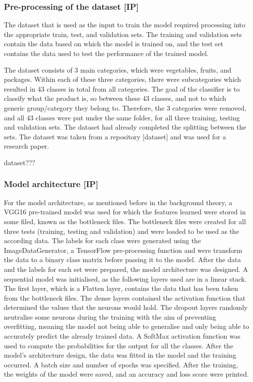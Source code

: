 \subsubsection{Pre-processing of the dataset [IP]}

The dataset that is used as the input to train the model required processing into the appropriate train, test, and validation sets.
The training and validation sets contain the data based on which the model is trained on, and the test set contains the data used to test the performance of the trained model.

The dataset consists of 3 main categories, which were vegetables, fruits, and packages.
Within each of these three categories, there were subcategories which resulted in 43 classes in total from all categories.
The goal of the classifier is to classify what the product is, so between these 43 classes, and not to which generic group/category they belong to.
Therefore, the 3 categories were removed, and all 43 classes were put under the same folder, for all three training, testing and validation sets.
The dataset had already completed the splitting between the sets.
The dataset was taken from a repository [dataset] and was used for a research paper.

dataset???

\subsubsection{Model architecture [IP]}

For the model architecture, as mentioned before in the background theory, a VGG16 pre-trained model was used for which the features learned were stored in some filed, known as the bottleneck files.
The bottleneck files were created for all three tests (training, testing and validation) and were loaded to be used as the according data.
The labels for each class were generated using the ImageDataGenerator, a TensorFlow pre-processing function and were transform the data to a binary class matrix before passing it to the model.
After the data and the labels for each set were prepared, the model architecture was designed.
A sequential model was initialised, as the following layers used are in a linear stack.
The first layer, which is a Flatten layer, contains the data that has been taken from the bottleneck files.
The dense layers contained the activation function that determined the values that the neurons would hold.
The dropout layers randomly neutralise some neurons during the training with the aim of preventing overfitting, meaning the model not being able to generalise and only being able to accurately predict the already trained data.
A SoftMax activation function was used to compute the probabilities for the output for all the classes.
After the model's architecture design, the data was fitted in the model and the training occurred.
A batch size and number of epochs was specified.
After the training, the weights of the model were saved, and an accuracy and loss score were printed.

